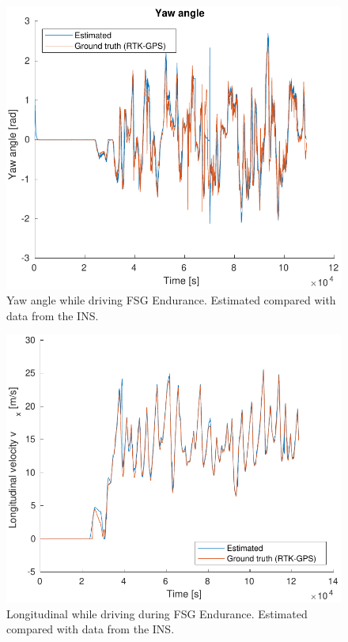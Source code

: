 \begin{figure}
    \centering
    \includegraphics[width=0.8\linewidth]{0_Images/6_Results/yawFSGEndurance.pdf}
    \caption[Yaw angle while driving FSG Endurance.]
    {Yaw angle while driving FSG Endurance. Estimated compared with data from the INS.}
    \label{Fig:YawFSGEndurance}
\end{figure}

\begin{figure}
    \centering
    \includegraphics[width=0.8\linewidth]{0_Images/6_Results/vxFSGEndurance.pdf}
    \caption[Longitudinal velocity while driving FSG Endurance.]
    {Longitudinal while driving  during FSG Endurance. Estimated compared with data from the INS.}
    \label{Fig:VxFSGEndurance}
\end{figure}


